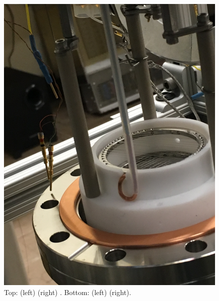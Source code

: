 \begin{figure}[htbp]
\begin{minipage}{0.47\textwidth}
    \includegraphics[width=\linewidth]{figures/testbed/ft5_4.jpg}
    \end{minipage}
\caption{Top: (left) (right) . Bottom: (left) (right).}
 \label{fig:shv20}
\end{figure}





